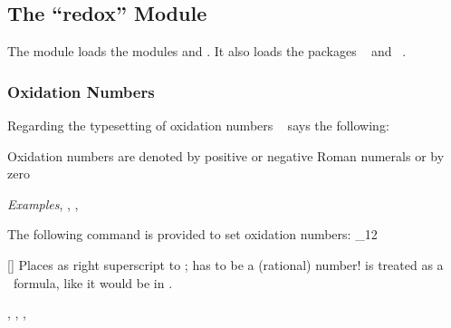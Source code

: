 \documentclass[load-preamble+]{cnltx-doc}
\makeatletter
\def\chemmodule*#1{\textquotedblleft#1\textquotedblright}%
\renewenvironment{commands}
  {%
    \cnltx@set@catcode_{12}%
    \let\command\cnltx@command
    \cnltxlist
  }
  {\endcnltxlist}
\makeatother
\begin{document}
\subsection{The \chemmodule*{redox} Module}\label{sec:redox-module}

The  module loads the modules  and
. It also loads the packages
~\cite{pkg:mathtools} and ~\cite{pkg:relsize}.

\subsubsection{Oxidation Numbers}\label{sec:oxidation-numbers}

Regarding the typesetting of oxidation numbers
~\cite{iupac:greenbook} says the following:
\begin{cnltxquote}
  Oxidation numbers are denoted by positive or negative Roman numerals or by
  zero \textelp{}

  \textit{Examples}\quad {}, , ,
\end{cnltxquote}

The following command is provided to set oxidation numbers:
\begin{commands}
  \command{ox}[\sarg{}]
    Places  as right superscript to ; 
    has to be a (rational) number!   is treated as a \chemformula\
    formula, like it would be in .
\end{commands}

\begin{example}
  , , , 
\end{example}
\end{document}

